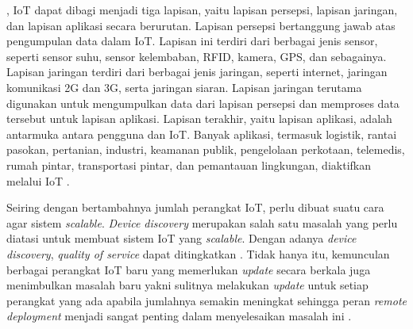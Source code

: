 , IoT dapat dibagi menjadi tiga lapisan, yaitu lapisan persepsi, lapisan jaringan, dan lapisan aplikasi secara berurutan. Lapisan persepsi bertanggung jawab atas pengumpulan data dalam IoT. Lapisan ini terdiri dari berbagai jenis sensor, seperti sensor suhu, sensor kelembaban, RFID, kamera, GPS, dan sebagainya. Lapisan jaringan terdiri dari berbagai jenis jaringan, seperti internet, jaringan komunikasi 2G dan 3G, serta jaringan siaran. Lapisan jaringan terutama digunakan untuk mengumpulkan data dari lapisan persepsi dan memproses data tersebut untuk lapisan aplikasi. Lapisan terakhir, yaitu lapisan aplikasi, adalah antarmuka antara pengguna dan IoT. Banyak aplikasi, termasuk logistik, rantai pasokan, pertanian, industri, keamanan publik, pengelolaan perkotaan, telemedis, rumah pintar, transportasi pintar, dan pemantauan lingkungan, diaktifkan melalui IoT \parencite{SmartHomeSystemBasedOnIoTTechnologies}.

Seiring dengan bertambahnya jumlah perangkat IoT, perlu dibuat suatu cara agar sistem \textit{scalable}. \textit{Device discovery} merupakan salah satu masalah yang perlu diatasi untuk membuat sistem IoT yang \textit{scalable}. Dengan adanya \textit{device discovery}, \textit{quality of service} dapat ditingkatkan \parencite{DeviceDiscovery}. Tidak hanya itu, kemunculan berbagai perangkat IoT baru yang memerlukan \textit{update} secara berkala juga menimbulkan masalah baru yakni sulitnya melakukan \textit{update} untuk setiap perangkat yang ada apabila jumlahnya semakin meningkat sehingga peran \textit{remote deployment} menjadi sangat penting dalam menyelesaikan masalah ini \parencite{RemoteDeployment}.